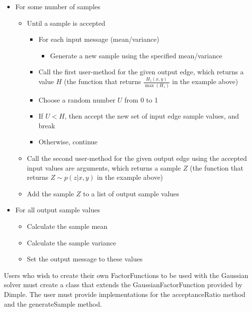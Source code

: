 \begin{itemize}
\item For some number of samples
\begin{itemize}
\item Until a sample is accepted
\begin{itemize}
\item For each input message (mean/variance)
\begin{itemize}
\item Generate a new sample using the specified mean/variance
\end{itemize}
\item Call the first user-method for the given output edge, which returns a value $H$ (the function that returns $\frac{H_{z}(x,y) }{\max(H_{z})}$ in the example above)
\item Choose a random number $U$ from 0 to 1
\item If $U < H$, then accept the new set of input edge sample values, and break
\item Otherwise, continue
\end{itemize}
\item Call the second user-method for the given output edge using the accepted input values are arguments, which returns a sample $Z$ (the function that returns $Z \sim p(z|x,y)$ in the example above)
\item Add the sample $Z$ to a list of output sample values
\end{itemize}
\item For all output sample values
\begin{itemize}
\item Calculate the sample mean
\item Calculate the sample variance
\item Set the output message to these values
\end{itemize}
\end{itemize}




Users who wish to create their own FactorFunctions to be used with the Gaussian solver must create a class that extends the GaussianFactorFunction provided by Dimple. The user must provide implementations for the acceptanceRatio method and the generateSample method.

